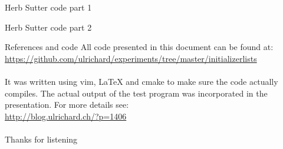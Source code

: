 \documentclass[11pt]{beamer}
\begin{document}
\begin{frame}{Herb Sutter code part 1}

\end{frame}

\begin{frame}{Herb Sutter code part 2}

\end{frame}

\begin{frame}{References and code}
All code presented in this document can be found at:\\
\href{https://github.com/ulrichard/experiments/tree/master/initializerlists}{https://github.com/ulrichard/experiments/tree/master/initializerlists}\\
\\[0.5cm]
It was written using vim, LaTeX and cmake to make sure the code actually compiles. The actual output of the test program was incorporated in the presentation. For more details see:\\
\href{http://blog.ulrichard.ch/?p=1406}{http://blog.ulrichard.ch/?p=1406}\\
\\[0.5cm]
Thanks for listening
\end{frame}
\end{document}
